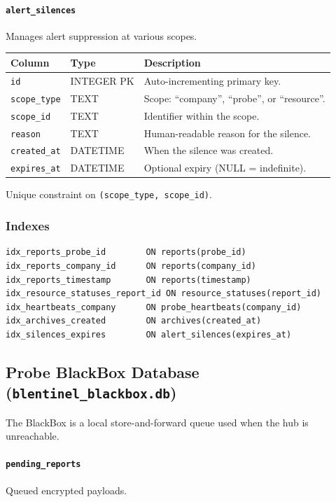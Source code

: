 \documentclass[12pt]{report}
\begin{document}
\paragraph{\texttt{alert\_silences}} Manages alert suppression at various
scopes.

\begin{longtable}{@{} l l p{6cm} @{}}
\toprule
\textbf{Column} & \textbf{Type} & \textbf{Description} \\
\midrule
\texttt{id} & INTEGER PK & Auto-incrementing primary key. \\
\texttt{scope\_type} & TEXT & Scope: ``company'', ``probe'', or ``resource''.
    \\
\texttt{scope\_id} & TEXT & Identifier within the scope. \\
\texttt{reason} & TEXT & Human-readable reason for the silence. \\
\texttt{created\_at} & DATETIME & When the silence was created. \\
\texttt{expires\_at} & DATETIME & Optional expiry (NULL = indefinite). \\
\bottomrule
\end{longtable}

Unique constraint on \texttt{(scope\_type, scope\_id)}.

\subsubsection{Indexes}

\begin{lstlisting}
idx_reports_probe_id        ON reports(probe_id)
idx_reports_company_id      ON reports(company_id)
idx_reports_timestamp       ON reports(timestamp)
idx_resource_statuses_report_id ON resource_statuses(report_id)
idx_heartbeats_company      ON probe_heartbeats(company_id)
idx_archives_created        ON archives(created_at)
idx_silences_expires        ON alert_silences(expires_at)
\end{lstlisting}

\subsection{Probe BlackBox Database (\texttt{blentinel\_blackbox.db})}

The BlackBox is a local store-and-forward queue used when the hub is
unreachable.

\paragraph{\texttt{pending\_reports}} Queued encrypted payloads.
\end{document}
